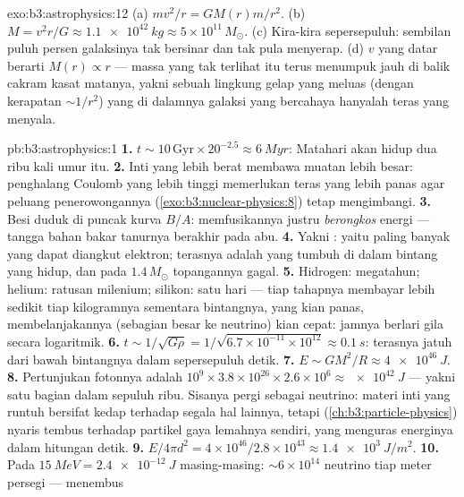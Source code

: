 \begin{solution}{exo:b3:astrophysics:12}
(a) $mv^2/r = GM(r)m/r^2$. (b) $M = v^2r/G \approx
\qty{1.1e42}{kg} \approx 5\times10^{11}\,M_\odot$. (c) Kira-kira
sepersepuluh: sembilan puluh persen galaksinya tak bersinar dan tak pula
menyerap. (d) $v$ yang datar berarti $M(r) \propto r$ --- massa yang tak
terlihat itu terus menumpuk jauh di balik cakram kasat matanya, yakni sebuah
lingkung gelap yang meluas (dengan kerapatan $\sim1/r^2$) yang di dalamnya
galaksi yang bercahaya hanyalah teras yang menyala.
\end{solution}

\begin{solution}{pb:b3:astrophysics:1}
\textbf{1.} $t \sim 10\,\text{Gyr}\times20^{-2.5} \approx
\qty{6}{Myr}$: Matahari akan hidup dua ribu kali umur itu.
\textbf{2.} Inti yang lebih berat membawa muatan lebih besar: penghalang
Coulomb yang lebih tinggi memerlukan teras yang lebih panas agar peluang
penerowongannya (\cref{exo:b3:nuclear-physics:8}) tetap mengimbangi.
\textbf{3.} Besi duduk di puncak kurva $B/A$: memfusikannya justru
\emph{berongkos} energi --- tangga bahan bakar tanurnya berakhir pada abu.
\textbf{4.} Yakni : yaitu paling banyak yang dapat
diangkut  elektron; terasnya adalah  yang tumbuh
di dalam bintang yang hidup, dan pada $1.4\,M_\odot$ topangannya gagal.
\textbf{5.} Hidrogen: megatahun; helium: ratusan milenium;
silikon: satu hari --- tiap tahapnya membayar lebih sedikit tiap kilogramnya sementara
bintangnya, yang kian panas, membelanjakannya (sebagian besar ke neutrino) kian cepat:
jamnya berlari gila secara logaritmik.
\textbf{6.} $t \sim 1/\sqrt{G\rho} =
1/\sqrt{6.7\times10^{-11}\times10^{12}} \approx \qty{0.1}{s}$:
terasnya jatuh dari bawah bintangnya dalam sepersepuluh detik.
\textbf{7.} $E \sim GM^2/R \approx \qty{4e46}{J}$.
\textbf{8.} Pertunjukan fotonnya adalah $10^9\times3.8\times10^{26}
\times2.6\times10^{6} \approx \qty{e42}{J}$ --- yakni satu bagian dalam
sepuluh ribu. Sisanya pergi sebagai neutrino: materi inti yang runtuh
bersifat kedap terhadap segala hal lainnya, tetapi
(\cref{ch:b3:particle-physics}) nyaris tembus terhadap partikel gaya
lemahnya sendiri, yang menguras energinya dalam hitungan detik.
\textbf{9.} $E/4\pi d^2 = 4\times10^{46}/2.8\times10^{43}
\approx \qty{1.4e3}{J/m^2}$.
\textbf{10.} Pada $\qty{15}{MeV} = \qty{2.4e-12}{J}$ masing-masing:
${\sim}6\times10^{14}$ neutrino tiap meter persegi --- menembus

\end{solution}
